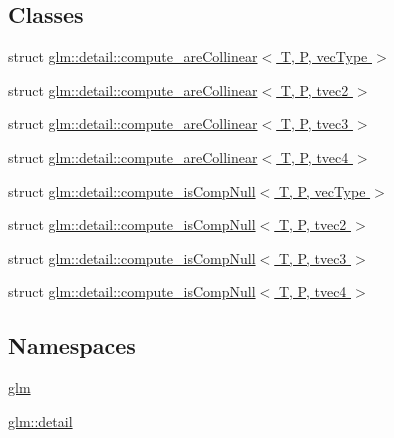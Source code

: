 \subsection*{Classes}
\begin{DoxyCompactItemize}
\item 
struct \hyperlink{structglm_1_1detail_1_1compute__are_collinear}{glm\+::detail\+::compute\+\_\+are\+Collinear$<$ T, P, vec\+Type $>$}
\item 
struct \hyperlink{structglm_1_1detail_1_1compute__are_collinear_3_01_t_00_01_p_00_01tvec2_01_4}{glm\+::detail\+::compute\+\_\+are\+Collinear$<$ T, P, tvec2 $>$}
\item 
struct \hyperlink{structglm_1_1detail_1_1compute__are_collinear_3_01_t_00_01_p_00_01tvec3_01_4}{glm\+::detail\+::compute\+\_\+are\+Collinear$<$ T, P, tvec3 $>$}
\item 
struct \hyperlink{structglm_1_1detail_1_1compute__are_collinear_3_01_t_00_01_p_00_01tvec4_01_4}{glm\+::detail\+::compute\+\_\+are\+Collinear$<$ T, P, tvec4 $>$}
\item 
struct \hyperlink{structglm_1_1detail_1_1compute__is_comp_null}{glm\+::detail\+::compute\+\_\+is\+Comp\+Null$<$ T, P, vec\+Type $>$}
\item 
struct \hyperlink{structglm_1_1detail_1_1compute__is_comp_null_3_01_t_00_01_p_00_01tvec2_01_4}{glm\+::detail\+::compute\+\_\+is\+Comp\+Null$<$ T, P, tvec2 $>$}
\item 
struct \hyperlink{structglm_1_1detail_1_1compute__is_comp_null_3_01_t_00_01_p_00_01tvec3_01_4}{glm\+::detail\+::compute\+\_\+is\+Comp\+Null$<$ T, P, tvec3 $>$}
\item 
struct \hyperlink{structglm_1_1detail_1_1compute__is_comp_null_3_01_t_00_01_p_00_01tvec4_01_4}{glm\+::detail\+::compute\+\_\+is\+Comp\+Null$<$ T, P, tvec4 $>$}
\end{DoxyCompactItemize}
\subsection*{Namespaces}
\begin{DoxyCompactItemize}
\item 
 \hyperlink{namespaceglm}{glm}
\item 
 \hyperlink{namespaceglm_1_1detail}{glm\+::detail}
\end{DoxyCompactItemize}
